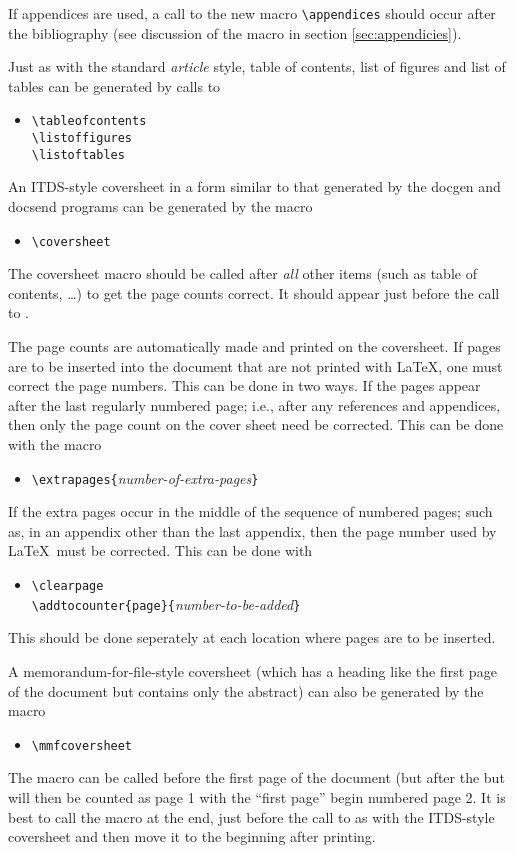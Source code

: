 If appendices are used, a call to the new macro \verb|\appendices|
should occur after the bibliography (see discussion of the macro in
section \ref{sec:appendicies}).
  
Just as with the standard {\it article} 
style, table of contents,
list of figures and list of tables can be generated by calls to 
\begin{itemize}
\item[]
\verb|\tableofcontents|\\
\verb|\listoffigures|\\
\verb|\listoftables|
\end{itemize}

An ITDS-style coversheet in a form similar to that generated by the
docgen and docsend programs can be generated by the macro
\begin{itemize}
\item[]
\verb|\coversheet|
\end{itemize}
The coversheet macro should be called after {\it all} other items
(such as table of contents, \dots) to get the page counts correct.
It should appear just before the call to \verb||.  

The page counts are automatically made and printed on the coversheet.
If pages are to be inserted into the document that are not printed
with \LaTeX , one must correct the page numbers.  This can be done in
two ways.  If the pages appear after the last regularly numbered page;
i.e., after any references and appendices, then only the page count on
the cover sheet need be corrected.  This can be done with the macro
\begin{itemize}
\item[]
\verb|\extrapages{|{\it number-of-extra-pages}\verb|}|
\end{itemize}
If the extra pages occur in the middle of the sequence of numbered
pages; such as, in an appendix other than the last appendix, then the
page number used by \LaTeX\ must be corrected.  This can be done with 
\begin{itemize}
\item[]
\verb|\clearpage|\\
\verb|\addtocounter{page}{|{\it number-to-be-added}\verb|}|
\end{itemize}
This should be done seperately at each location where pages are to be
inserted. 

A memorandum-for-file-style coversheet (which has a heading like the
first page of the document but contains only the abstract) can also be
generated by the macro 
\begin{itemize}
\item[]
\verb|\mmfcoversheet|
\end{itemize}
The macro can be called before the first page of the document (but
after the \verb|| but will then be counted as page 1
with the ``first page'' begin numbered page 2.  It is best to call the
macro at the end, just before the call to \verb|| as
with the ITDS-style coversheet and then move it to the beginning after
printing.
